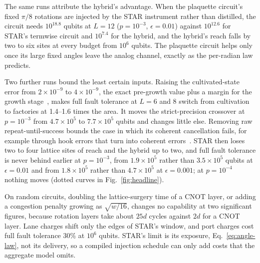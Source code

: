 \documentclass[11pt]{article}
\newcommand{\eps}{\epsilon}
\begin{document}
The same runs attribute the hybrid's advantage. When the plaquette circuit's
fixed $\pi/8$ rotations are injected by the STAR instrument rather than
distilled, the circuit needs $10^{18.8}$ qubits at $L=12$ ($p=10^{-3}$,
$\eps=0.01$) against $10^{12.6}$ for STAR's termwise circuit and $10^{7.4}$ for the
hybrid, and the hybrid's reach falls by two to six sites at every budget
from $10^6$ qubits. The plaquette circuit helps only once its large fixed
angles leave the analog channel, exactly as the per-radian law predicts.

Two further runs bound the least certain inputs. Raising the cultivated-state
error from $2\times10^{-9}$ to $4\times10^{-9}$, the exact pre-growth value plus a
margin for the growth stage~\cite{wan2026exact}, makes full fault tolerance at
$L=6$ and 8 switch from cultivation to factories at 1.4--1.6 times the area. It
moves the strict-precision crossover at $p=10^{-3}$ from $4.7\times10^5$ to
$7.7\times10^5$ qubits and changes little else. Removing raw repeat-until-success
bounds the case in which its coherent cancellation fails, for example through
hook errors that turn into coherent errors~\cite{chan2026hook}. STAR then loses two
to four lattice sites of reach and the hybrid up to two, and full fault
tolerance is never behind earlier at $p=10^{-3}$, from $1.9\times10^5$ rather than
$3.5\times10^5$ qubits at $\eps=0.01$ and from $1.8\times10^5$ rather than
$4.7\times10^5$ at $\eps=0.001$; at $p=10^{-4}$ nothing moves (dotted curves in
Fig.~\ref{fig:headline}).

On random circuits, doubling the lattice-surgery time of a CNOT layer, or adding
a congestion penalty growing as $\sqrt{w/16}$, changes no capability at two
significant figures, because rotation layers take about $25d$ cycles against
$2d$ for a CNOT layer. Lane charges shift only the edges of STAR's window, and
port charges cost full fault tolerance 30\% at $10^6$ qubits. STAR's limit is
its exposure, Eq.~\eqref{eq:angle-law}, not its delivery, so a compiled
injection schedule can only add costs that the aggregate model omits.
\end{document}
